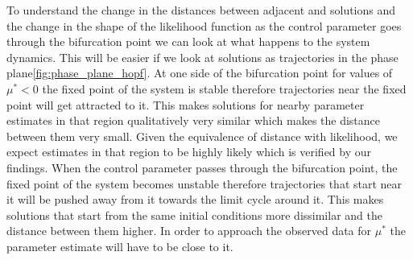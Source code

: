 \documentclass[12pt,a4paper,titlepage]{article}
\begin{document}
To understand the change in the distances between adjacent and solutions and the change in the shape of the likelihood function as the control parameter goes through the bifurcation point we can look at what happens to the system dynamics. This will be easier if we look at solutions as trajectories in the phase plane\ref{fig:phase_plane_hopf}. At one side of the bifurcation point for values of $\mu^* < 0$ the fixed point of the system is stable therefore trajectories near the fixed point will get attracted to it. This makes solutions for nearby parameter estimates in that region qualitatively very similar which makes the distance between them very small. Given the equivalence of distance with likelihood, we expect estimates in that region to be highly likely which is verified by our findings. When the control parameter passes through the bifurcation point, the fixed point of the system becomes unstable therefore trajectories that start near it will be pushed away from it towards the limit cycle around it. This makes solutions that start from the same initial conditions more dissimilar and the distance between them higher. In order to approach the observed data for $\mu^*$ the parameter estimate will have to be close to it.
\end{document}
